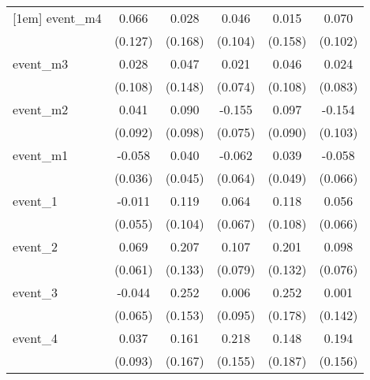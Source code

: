 {\begin{tabular}{l*{5}{c}}
[1em]
event\_m4    &       0.066         &       0.028         &       0.046         &       0.015         &       0.070         \\
            &     (0.127)         &     (0.168)         &     (0.104)         &     (0.158)         &     (0.102)         \\
[1em]
event\_m3    &       0.028         &       0.047         &       0.021         &       0.046         &       0.024         \\
            &     (0.108)         &     (0.148)         &     (0.074)         &     (0.108)         &     (0.083)         \\
[1em]
event\_m2    &       0.041         &       0.090         &      -0.155\sym{*}  &       0.097         &      -0.154         \\
            &     (0.092)         &     (0.098)         &     (0.075)         &     (0.090)         &     (0.103)         \\
[1em]
event\_m1    &      -0.058         &       0.040         &      -0.062         &       0.039         &      -0.058         \\
            &     (0.036)         &     (0.045)         &     (0.064)         &     (0.049)         &     (0.066)         \\
[1em]
event\_1     &      -0.011         &       0.119         &       0.064         &       0.118         &       0.056         \\
            &     (0.055)         &     (0.104)         &     (0.067)         &     (0.108)         &     (0.066)         \\
[1em]
event\_2     &       0.069         &       0.207         &       0.107         &       0.201         &       0.098         \\
            &     (0.061)         &     (0.133)         &     (0.079)         &     (0.132)         &     (0.076)         \\
[1em]
event\_3     &      -0.044         &       0.252         &       0.006         &       0.252         &       0.001         \\
            &     (0.065)         &     (0.153)         &     (0.095)         &     (0.178)         &     (0.142)         \\
[1em]
event\_4     &       0.037         &       0.161         &       0.218         &       0.148         &       0.194         \\
            &     (0.093)         &     (0.167)         &     (0.155)         &     (0.187)         &     (0.156)         \\

\end{tabular}}
